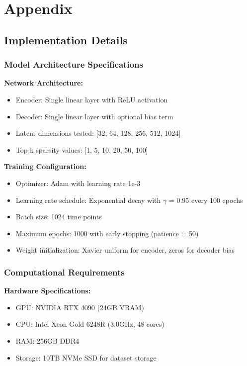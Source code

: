 \section{Appendix}

\subsection{Implementation Details}

\subsubsection{Model Architecture Specifications}

\textbf{Network Architecture:}
\begin{itemize}
\item Encoder: Single linear layer with ReLU activation
\item Decoder: Single linear layer with optional bias term
\item Latent dimensions tested: [32, 64, 128, 256, 512, 1024]
\item Top-k sparsity values: [1, 5, 10, 20, 50, 100]
\end{itemize}

\textbf{Training Configuration:}
\begin{itemize}
\item Optimizer: Adam with learning rate 1e-3
\item Learning rate schedule: Exponential decay with $\gamma$ = 0.95 every 100 epochs
\item Batch size: 1024 time points
\item Maximum epochs: 1000 with early stopping (patience = 50)
\item Weight initialization: Xavier uniform for encoder, zeros for decoder bias
\end{itemize}

\subsubsection{Computational Requirements}

\textbf{Hardware Specifications:}
\begin{itemize}
\item GPU: NVIDIA RTX 4090 (24GB VRAM)
\item CPU: Intel Xeon Gold 6248R (3.0GHz, 48 cores)
\item RAM: 256GB DDR4
\item Storage: 10TB NVMe SSD for dataset storage
\end{itemize}

